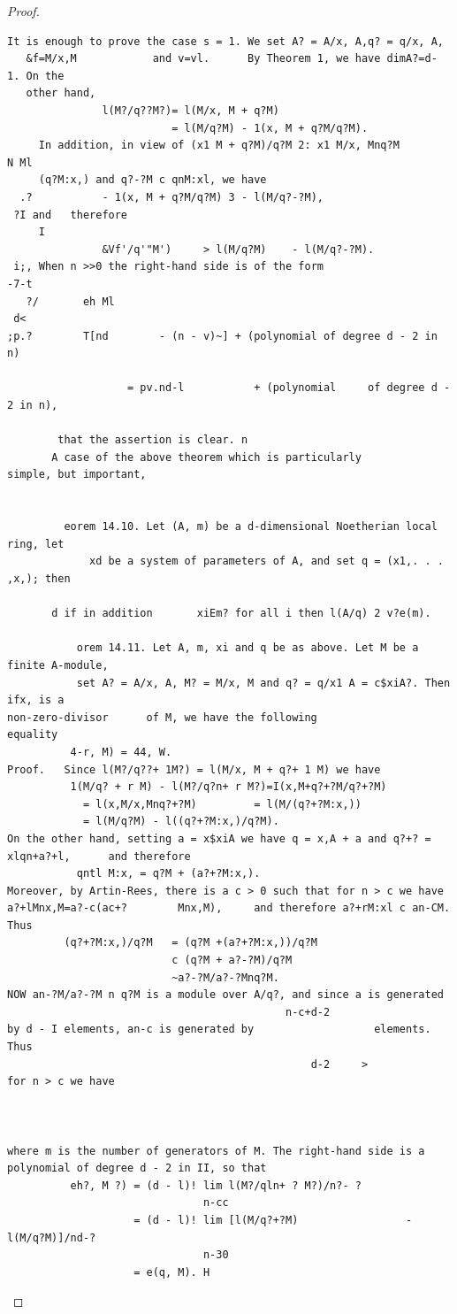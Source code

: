 \begin{proof}
\begin{verbatim}
It is enough to prove the case s = 1. We set A? = A/x, A,q? = q/x, A,
   &f=M/x,M            and v=vl.      By Theorem 1, we have dimA?=d-              1. On the
   other hand,
               l(M?/q??M?)= l(M/x, M + q?M)
                          = l(M/q?M) - 1(x, M + q?M/q?M).
     In addition, in view of (x1 M + q?M)/q?M 2: x1 M/x, Mnq?M                        N Ml
     (q?M:x,) and q?-?M c qnM:xl, we have
  .?           - 1(x, M + q?M/q?M) 3 - l(M/q?-?M),
 ?I and   therefore
     I
               &Vf'/q'"M')     > l(M/q?M)    - l(M/q?-?M).
 i;, When n >>0 the right-hand side is of the form
-7-t
   ?/       eh Ml
 d<
;p.?        T[nd        - (n - v)~] + (polynomial of degree d - 2 in n)

                   = pv.nd-l           + (polynomial     of degree d - 2 in n),

        that the assertion is clear. n
       A case of the above theorem which is particularly          simple, but important,


         eorem 14.10. Let (A, m) be a d-dimensional Noetherian local ring, let
             xd be a system of parameters of A, and set q = (x1,. . . ,x,); then

       d if in addition       xiEm? for all i then l(A/q) 2 v?e(m).

           orem 14.11. Let A, m, xi and q be as above. Let M be a finite A-module,
           set A? = A/x, A, M? = M/x, M and q? = q/x1 A = c$xiA?. Then ifx, is a
non-zero-divisor      of M, we have the following                   equality
          4-r, M) = 44, W.
Proof.   Since l(M?/q??+ 1M?) = l(M/x, M + q?+ 1 M) we have
          1(M/q? + r M) - l(M?/q?n+ r M?)=I(x,M+q?+?M/q?+?M)
            = l(x,M/x,Mnq?+?M)         = l(M/(q?+?M:x,))
            = l(M/q?M) - l((q?+?M:x,)/q?M).
On the other hand, setting a = x$xiA we have q = x,A + a and q?+? =
xlqn+a?+l,      and therefore
           qntl M:x, = q?M + (a?+?M:x,).
Moreover, by Artin-Rees, there is a c > 0 such that for n > c we have
a?+lMnx,M=a?-c(ac+?        Mnx,M),     and therefore a?+rM:xl c an-CM.
Thus
         (q?+?M:x,)/q?M   = (q?M +(a?+?M:x,))/q?M
                          c (q?M + a?-?M)/q?M
                          ~a?-?M/a?-?Mnq?M.
NOW an-?M/a?-?M n q?M is a module over A/q?, and since a is generated
                                            n-c+d-2
by d - I elements, an-c is generated by                   elements. Thus
                                                d-2     >
for n > c we have



where m is the number of generators of M. The right-hand side is a
polynomial of degree d - 2 in II, so that
          eh?, M ?) = (d - l)! lim l(M?/qln+ ? M?)/n?- ?
                               n-cc
                    = (d - l)! lim [l(M/q?+?M)                 - l(M/q?M)]/nd-?
                               n-30
                    = e(q, M). H
\end{verbatim}
\end{proof}


